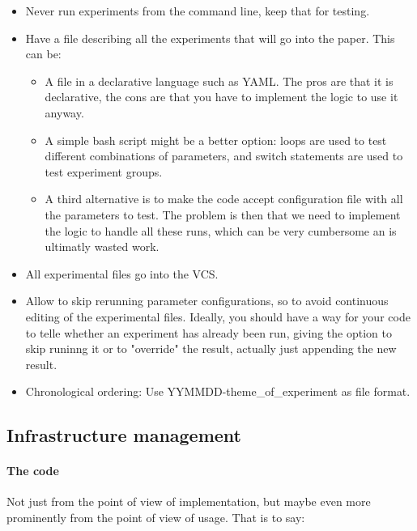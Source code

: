 \documentclass{llncs}
\begin{document}
\begin{itemize}
\item Never run experiments from the command line, keep that for testing.
\item Have a file describing all the experiments that will go into the paper. This
  can be:
  \begin{itemize}
  \item A file in a declarative language such as YAML. The pros are that it is
    declarative, the cons are that you have to implement the logic to use it
    anyway.
  \item A simple bash script might be a better option: loops are used to test
      different combinations of parameters, and switch statements are used to
      test experiment groups.
  \item A third alternative is to make the code accept configuration file with all
      the parameters to test. The problem is then that we need to implement the
      logic to handle all these runs, which can be very cumbersome an is
      ultimatly wasted work.
  \end{itemize}
\item All experimental files go into the VCS. 
\item Allow to skip rerunning parameter configurations, so to avoid continuous
  editing of the experimental files. Ideally, you should have a way for your
  code to telle whether an experiment has already been run, giving the option
  to skip runinng it or to "override" the result, actually just appending the
  new result.
 \item Chronological ordering: Use YYMMDD-theme\_of\_experiment as file format.
\end{itemize}

\subsection{Infrastructure management}

\paragraph{The code}

Not just from the point of view of implementation, but maybe even more
prominently from the point of view of usage. That is to say:
\end{document}
